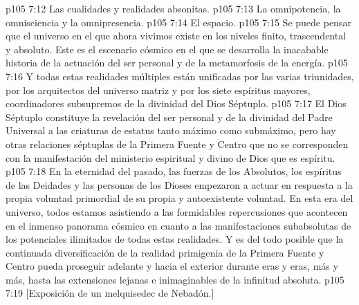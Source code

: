 \vs p105 7:12 Las cualidades y realidades absonitas.
\vs p105 7:13 La omnipotencia, la omnisciencia y la omnipresencia.
\vs p105 7:14 El espacio.
\vs p105 7:15 \pc Se puede pensar que el universo en el que ahora vivimos existe en los niveles finito, trascendental y absoluto. Este es el escenario cósmico en el que se desarrolla la inacabable historia de la actuación del ser personal y de la metamorfosis de la energía.
\vs p105 7:16 Y todas estas realidades múltiples están unificadas  por las varias triunidades,  por los arquitectos del universo matriz y  por los siete espíritus mayores, coordinadores subsupremos de la divinidad del Dios Séptuplo.
\vs p105 7:17 El Dios Séptuplo constituye la revelación del ser personal y de la divinidad del Padre Universal a las criaturas de estatus tanto máximo como submáximo, pero hay otras relaciones séptuplas de la Primera Fuente y Centro que no se corresponden con la manifestación del ministerio espiritual y divino de Dios que es espíritu.
\vs p105 7:18 \pc En la eternidad del pasado, las fuerzas de los Absolutos, los espíritus de las Deidades y las personas de los Dioses empezaron a actuar en respuesta a la propia voluntad primordial de su propia y autoexistente voluntad. En esta era del universo, todos estamos asistiendo a las formidables repercusiones que acontecen en el inmenso panorama cósmico en cuanto a las manifestaciones subabsolutas de los potenciales ilimitados de todas estas realidades. Y es del todo posible que la continuada diversificación de la realidad primigenia de la Primera Fuente y Centro pueda proseguir adelante y hacia el exterior durante eras y eras, más y más, hasta las extensiones lejanas e inimaginables de la infinitud absoluta.
\vsetoff
\vs p105 7:19 [Exposición de un melquisedec de Nebadón.]
